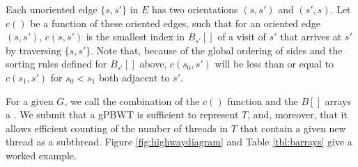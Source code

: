 Each unoriented edge $\{ s, s' \}$ in $E$ has two orientations $(s, s')$ and $(s', s)$. Let $c()$ be a function of these oriented edges, such that for an oriented edge $( s, s' )$, $c(s, s')$ is the smallest index in $B_{s'}[]$ of a visit of $s'$ that arrives at $s'$ by traversing $\{ s, s' \}$. Note that, because of the global ordering of sides and the sorting rules defined for $B_{s'}[]$ above, $c(s_0, s')$ will be less than or equal to $c(s_1, s')$ for $s_0 < s_1$ both adjacent to $s'$.


For a given $G$, we call the combination of the $c()$ function and the $B[]$ arrays a . We submit that a gPBWT is sufficient to represent $T$, and, moreover, that it allows efficient counting of the number of threads in $T$ that contain a given new thread as a subthread. Figure \ref{fig:highwaydiagram} and Table \ref{tbl:barrays} give a worked example.

